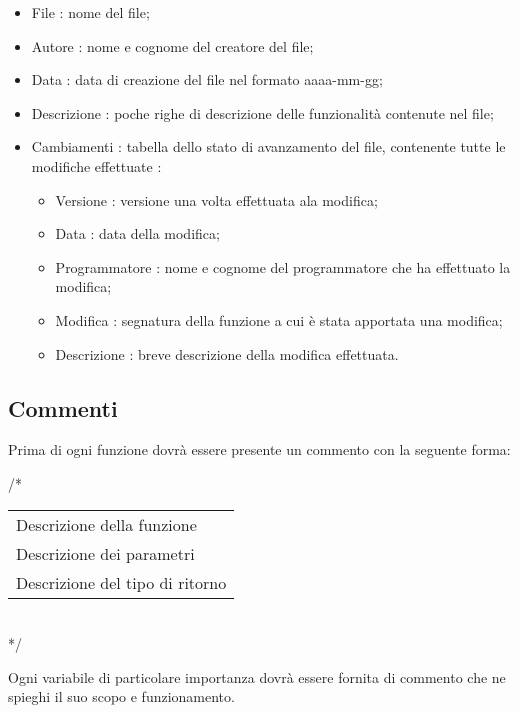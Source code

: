 \begin{itemize}
	\item File : nome del file;
	\item Autore : nome e cognome del creatore del file;
	\item Data : data di creazione del file nel formato aaaa-mm-gg;
	\item Descrizione : poche righe di descrizione delle funzionalità contenute nel file;
	\item Cambiamenti : tabella dello stato di avanzamento del file, contenente tutte le modifiche effettuate :
		\begin{itemize}
			\item Versione : versione una volta effettuata ala modifica;
			\item Data : data della modifica;
			\item Programmatore : nome e cognome del programmatore che ha effettuato la modifica;
			\item Modifica : segnatura della funzione a cui è stata apportata una modifica;
			\item Descrizione : breve descrizione della modifica effettuata.
		\end{itemize}
\end{itemize}

\subsection{Commenti}

Prima di ogni funzione dovrà essere presente un commento con la seguente forma:

\begin{flushleft}
/*\\
\vspace{3mm}
\begin{tabular}{l}
	Descrizione della funzione\\
	Descrizione dei parametri\\		
	Descrizione del tipo di ritorno\\
\end{tabular}\\
\vspace{3mm}
*/

\end{flushleft}

Ogni variabile di particolare importanza dovrà essere fornita di commento che ne spieghi il suo scopo e funzionamento.